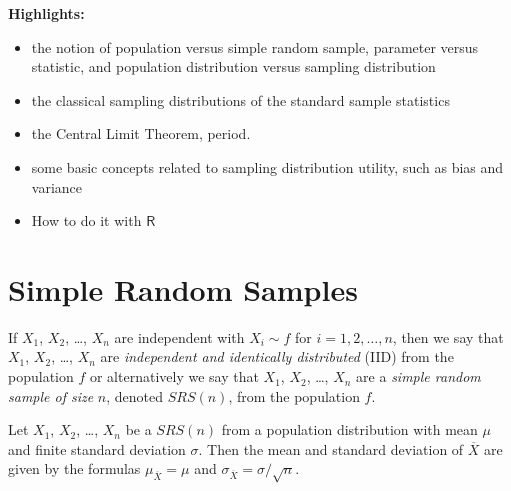 \textbf{Highlights:}
\begin{itemize}
\item the notion of population versus simple random sample, parameter
versus statistic, and population distribution versus sampling
distribution
\item the classical sampling distributions of the standard sample statistics
\item the Central Limit Theorem, period.
\item some basic concepts related to sampling distribution utility, such
as bias and variance
\item How to do it with $\mathsf{R}$
\end{itemize}

\section{Simple Random Samples}
\label{sec-8-1}

\begin{defn}
If \(X_{1}\), \(X_{2}\), \ldots{}, \(X_{n}\) are independent with
\(X_{i}\sim f\) for \(i=1,2,\ldots,n\), then we say that \(X_{1}\),
\(X_{2}\), \ldots{}, \(X_{n}\) are \emph{independent and identically
distributed} (IID) from the population \(f\) or alternatively we say
that \(X_{1}\), \(X_{2}\), \ldots{}, \(X_{n}\) are a \emph{simple random sample
of size} \(n\), denoted \(SRS(n)\), from the population \(f\).
\end{defn}

\begin{prop}
\label{pro-mean-sd-xbar} Let \(X_{1}\), \(X_{2}\), \ldots{}, \(X_{n}\) be a
\(SRS(n)\) from a population distribution with mean \(\mu\) and finite
standard deviation \(\sigma\). Then the mean and standard deviation of
\(\overline{X}\) are given by the formulas \(\mu_{\overline{X}}=\mu\)
and \(\sigma_{\overline{X}}=\sigma/\sqrt{n}\).
\end{prop}

